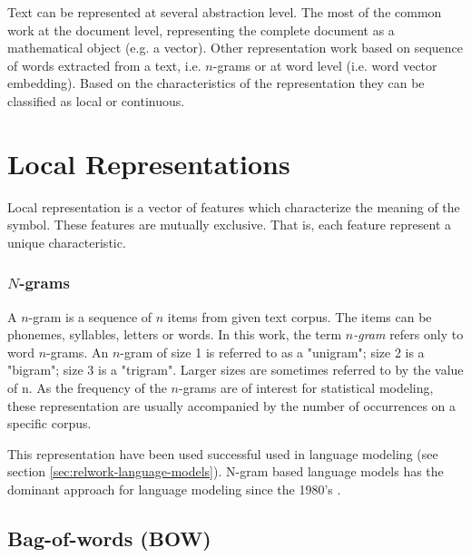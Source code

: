   Text can be represented at several abstraction level.  The most of the
  common work at the document level, representing the complete document as a
  mathematical object (e.g. a vector). Other representation work based on
  sequence of words extracted from a text, i.e. $n$-grams or at word level
  (i.e. word vector embedding). Based on the characteristics of the
  representation they can be classified as local or continuous. 
 
  

\section{Local Representations}
 \label{sec:rel_local_representation}
 Local representation is a vector of features which characterize the
 meaning of the symbol. These  features  are mutually exclusive. That is, each feature
 represent a unique characteristic.
 
 \subsubsection{$N$-grams}
 \label{sec:sub_ngrams}

A $n$-gram is a sequence of $n$ items from given text corpus. The items can
be phonemes, syllables, letters or words. In this  work, the term
\textit{$n$-gram} refers only   to  word $n$-grams.
An $n$-gram of size 1 is referred to as a "unigram"; size 2 is a "bigram";
size 3 is a "trigram". Larger sizes are sometimes referred to by the value of
n. As the frequency of the $n$-grams are of interest for statistical
modeling, these representation are usually accompanied by the number of
occurrences on a specific corpus. 


This representation  have been used successful used in language modeling (see section
\ref{sec:relwork-language-models}). N-gram based language models has the dominant approach for
 language modeling since the 1980's \cite{Bengio:2008}.



 \subsection{Bag-of-words (BOW)}
 \label{sec:rel_bow}

